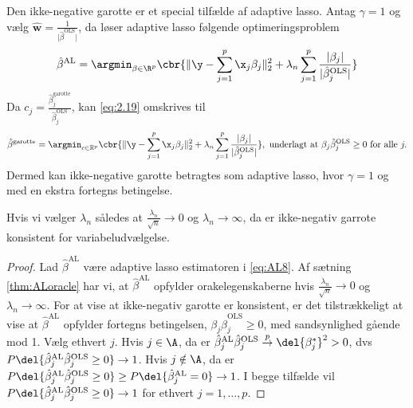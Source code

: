 Den ikke-negative garotte er et special tilfælde af adaptive lasso.
Antag \(\gamma=1\) og vælg \(\hat{\mathbf{w}}=\frac{1}{\vert \hat{\beta}^{\text{OLS}} \vert}\), da løser adaptive lasso følgende optimeringsproblem
\begin{align}
\hat{\beta}^\text{AL} = \argmin_{\beta \in \R^p} \cbr{ \Vert \y - \sum_{j=1}^p \x_j \beta_j \Vert_2^2 + \lambda_n \sum_{j=1}^p \frac{\vert \beta_j \vert}{\vert \hat{\beta}_j^\text{OLS} \vert}} \label{eq:AL8}
\end{align}
Da \(c_j = \frac{\hat{\beta}_j^\text{garotte}}{\hat{\beta}_j^\text{OLS}}\), kan \eqref{eq:2.19} omskrives til
\begin{align*}
\hat{\beta}^\text{garotte} =\argmin_{c \in \mathbb{R}^p}  \cbr{ \Vert \y - \sum_{j=1}^p \x_j \beta_j \Vert_2^2 + \lambda_n \sum_{j=1}^p  \frac{\vert \beta_j\vert}{\vert\hat{\beta}_j^\text{OLS}\vert}}, \ \text{underlagt at } \beta_j \hat{\beta}_j^\text{OLS} \geq 0 \text{ for alle } j.
\end{align*}
Dermed kan ikke-negative garotte betragtes som adaptive lasso, hvor \(\gamma=1\) og med en ekstra fortegns betingelse.
%
\begin{cor}
Hvis vi vælger \(\lambda_n\) således at \(\frac{\lambda_n}{\sqrt{n}} \rightarrow 0\) og \(\lambda_n \rightarrow \infty\), da er ikke-negativ garrote konsistent for variabeludvælgelse.
\end{cor}
%
\begin{proof}
Lad \(\hat{\beta}^\text{AL}\) være adaptive lasso estimatoren i \eqref{eq:AL8}.
Af sætning \ref{thm:ALoracle} har vi, at \(\hat{\beta}^\text{AL}\) opfylder orakelegenskaberne hvis \(\frac{\lambda_n}{\sqrt{n}} \rightarrow 0\) og \(\lambda_n \rightarrow \infty\).
For at vise at ikke-negativ garotte er konsistent, er det tilstrækkeligt at vise at \(\hat{\beta}^\text{AL}\) opfylder fortegns betingelsen, \(\beta_j \hat{\beta}_j^\text{OLS} \geq 0 \), med sandsynlighed gående mod 1.
Vælg ethvert \(j\).
Hvis \(j \in \A\), da er \(\hat{\beta}_j^\text{AL} \hat{\beta}_j^\text{OLS} \overset{p}{\rightarrow} \del{\beta_j^*}^2 > 0\), dvs \(P \del{\hat{\beta}_j^\text{AL} \hat{\beta}_j^\text{OLS} \geq 0} \rightarrow 1\).
Hvis \(j \notin \A\), da er \(P \del{\hat{\beta}_j^\text{AL} \hat{\beta}_j^\text{OLS} \geq 0} \geq P \del{\hat{\beta}_j^\text{AL} = 0} \rightarrow 1\).
I begge tilfælde vil \(P \del{\hat{\beta}_j^\text{AL} \hat{\beta}_j^\text{OLS} \geq 0} \rightarrow 1\) for ethvert \(j = 1, \ldots, p\).
\end{proof}